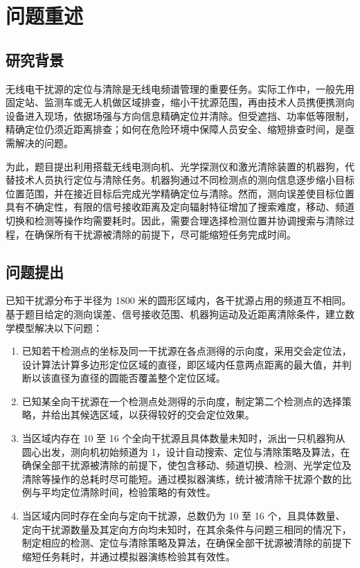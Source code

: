 \documentclass[withoutpreface,bwprint]{cumcmthesis} %
\begin{document}
\section{问题重述}
\subsection{研究背景}
无线电干扰源的定位与清除是无线电频谱管理的重要任务。实际工作中，一般先用固定站、监测车或无人机做区域排查，缩小干扰源范围，再由技术人员携便携测向设备进入现场，依据场强与方向信息精确定位并清除。但受遮挡、功率低等限制，精确定位仍须近距离排查；如何在危险环境中保障人员安全、缩短排查时间，是亟需解决的问题。

为此，题目提出利用搭载无线电测向机、光学探测仪和激光清除装置的机器狗，代替技术人员执行定位与清除任务。机器狗通过不同检测点的测向信息逐步缩小目标位置范围，并在接近目标后完成光学精确定位与清除。然而，测向误差使目标位置具有不确定性，有限的信号接收距离及定向辐射特征增加了搜索难度，移动、频道切换和检测等操作均需要耗时。因此，需要合理选择检测位置并协调搜索与清除过程，在确保所有干扰源被清除的前提下，尽可能缩短任务完成时间。

\subsection{问题提出}

已知干扰源分布于半径为 1800 米的圆形区域内，各干扰源占用的频道互不相同。基于题目给定的测向误差、信号接收范围、机器狗运动及近距离清除条件，建立数学模型解决以下问题：

\begin{enumerate}
  \item 已知若干检测点的坐标及同一干扰源在各点测得的示向度，采用交会定位法，设计算法计算多边形定位区域的直径，即区域内任意两点距离的最大值，并判断以该直径为直径的圆能否覆盖整个定位区域。
  
  \item 已知某全向干扰源在一个检测点处测得的示向度，制定第二个检测点的选择策略，并给出其候选区域，以获得较好的交会定位效果。
  
  \item 当区域内存在 10 至 16 个全向干扰源且具体数量未知时，派出一只机器狗从圆心出发，测向机初始频道为 1，设计自动搜索、定位与清除策略及算法，在确保全部干扰源被清除的前提下，使包含移动、频道切换、检测、光学定位及清除等操作的总耗时尽可能短。通过模拟器演练，统计被清除干扰源个数的比例与平均定位清除时间，检验策略的有效性。

  \item 当区域内同时存在全向与定向干扰源，总数仍为 10 至 16 个，且具体数量、定向干扰源数量及其定向方向均未知时，在其余条件与问题三相同的情况下，制定相应的检测、定位与清除策略及算法，在确保全部干扰源被清除的前提下缩短任务耗时，并通过模拟器演练检验其有效性。
  
\end{enumerate}
\end{document}
